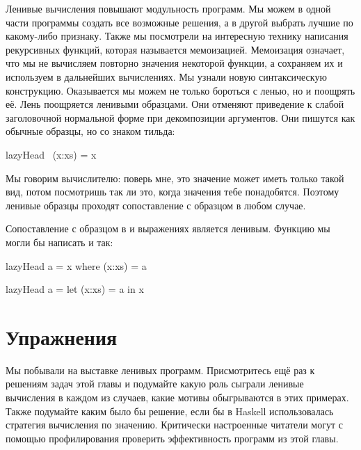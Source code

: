 Ленивые вычисления повышают модульность программ. Мы можем в одной части
программы создать все возможные решения, а в другой выбрать лучшие по
какому-либо признаку. Также мы посмотрели на интересную технику
написания рекурсивных функций, которая называется мемоизацией.
Мемоизация означает, что мы не вычисляем повторно значения некоторой
функции, а сохраняем их и используем в дальнейших вычислениях. Мы узнали
новую синтаксическую конструкцию. Оказывается мы можем не только
бороться с ленью, но и поощрять её. Лень поощряется ленивыми образцами.
Они отменяют приведение к слабой заголовочной нормальной форме при
декомпозиции аргументов. Они пишутся как обычные образцы, но со знаком
тильда:


\begin{code}
lazyHead ~(x:xs) = x
\end{code}

Мы говорим вычислителю: поверь мне, это значение может иметь только
такой вид, потом посмотришь так ли это, когда значения тебе понадобятся.
Поэтому ленивые образцы проходят сопоставление с образцом в любом
случае.

Сопоставление с образцом в  и  выражениях является
ленивым. Функцию  мы могли бы написать и так:


\begin{code}
lazyHead a = x
    where (x:xs) = a

lazyHead a = 
    let (x:xs) = a
    in  x
\end{code}

\section{Упражнения}

Мы побывали на выставке ленивых программ. Присмотритесь ещё раз к
решениям задач этой главы и подумайте какую роль сыграли ленивые
вычисления в каждом из случаев, какие мотивы обыгрываются в этих
примерах. Также подумайте каким было бы решение, если бы в Haskell
использовалась стратегия вычисления по значению. Критически настроенные
читатели могут с помощью профилирования проверить эффективность программ
из этой главы.
